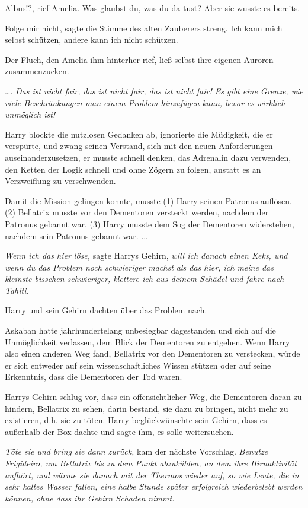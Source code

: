 \glqq{}Albus!?\grqq{}, rief Amelia. \glqq{}Was glaubst du, was du da tust?\grqq{}
Aber sie wusste es bereits.

\glqq{}Folge mir nicht\grqq{}, sagte die Stimme des alten Zauberers streng. \glqq{}
Ich kann mich selbst schützen, andere kann ich nicht schützen.\grqq{}

Der Fluch, den Amelia ihm hinterher rief, ließ selbst ihre eigenen Auroren
zusammenzucken.

…. \emph{Das ist nicht fair, das ist nicht fair, das ist nicht fair! Es gibt
eine Grenze, wie viele Beschränkungen man einem Problem hinzufügen kann, bevor
es wirklich unmöglich ist!}

Harry blockte die nutzlosen Gedanken ab, ignorierte die Müdigkeit, die er
verspürte, und zwang seinen Verstand, sich mit den neuen Anforderungen
auseinanderzusetzen, er musste schnell denken, das Adrenalin dazu verwenden, den
Ketten der Logik schnell und ohne Zögern zu folgen, anstatt es an Verzweiflung
zu verschwenden.

Damit die Mission gelingen konnte, musste (1) Harry seinen Patronus auflösen.
(2) Bellatrix musste vor den Dementoren versteckt werden, nachdem der Patronus
gebannt war. (3) Harry musste dem Sog der Dementoren widerstehen, nachdem sein
Patronus gebannt war. ...

\emph{Wenn ich das hier löse,} sagte Harrys Gehirn,\emph{ will ich danach einen
Keks, und wenn du das Problem noch schwieriger machst als das hier, ich meine
das kleinste bisschen schwieriger, klettere ich aus deinem Schädel und fahre
nach Tahiti.}

Harry und sein Gehirn dachten über das Problem nach.

Askaban hatte jahrhundertelang unbesiegbar dagestanden und sich auf die
Unmöglichkeit verlassen, dem Blick der Dementoren zu entgehen. Wenn Harry also
einen anderen Weg fand, Bellatrix vor den Dementoren zu verstecken, würde er
sich entweder auf sein wissenschaftliches Wissen stützen oder auf seine
Erkenntnis, dass die Dementoren der Tod waren.

Harrys Gehirn schlug vor, dass ein offensichtlicher Weg, die Dementoren daran zu
hindern, Bellatrix zu sehen, darin bestand, sie dazu zu bringen, nicht mehr zu
existieren, d.h. sie zu töten. Harry beglückwünschte sein Gehirn, dass es
außerhalb der Box dachte und sagte ihm, es solle weitersuchen.

\emph{Töte sie und bring sie dann zurück,} kam der nächste Vorschlag.
\emph{Benutze Frigideiro, um Bellatrix bis zu dem Punkt abzukühlen, an dem ihre
Hirnaktivität aufhört, und wärme sie danach mit der Thermos wieder auf, so wie
Leute, die in sehr kaltes Wasser fallen, eine halbe Stunde später erfolgreich
wiederbelebt werden können, ohne dass ihr Gehirn Schaden nimmt.}

